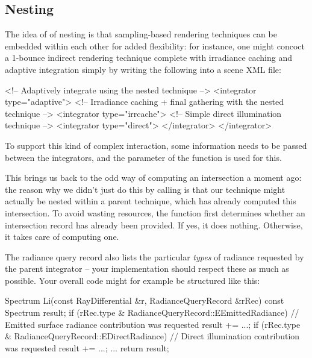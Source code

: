 \subsection{Nesting}
The idea of of nesting is that sampling-based rendering techniques can be
embedded within each other for added flexibility: for instance, one 
might concoct a  1-bounce indirect rendering technique complete with 
irradiance caching and adaptive integration simply by writing the following 
into a scene XML file:
\begin{xml}
<!-- Adaptively integrate using the nested technique -->
<integrator type="adaptive"> 
	<!-- Irradiance caching + final gathering with the nested technique -->
	<integrator type="irrcache"> 
		<!-- Simple direct illumination technique -->
		<integrator type="direct"> 
	</integrator>
</integrator>
\end{xml}
To support this kind of complex interaction, some information needs to be passed between the 
integrators, and the  parameter of the function
 is used for this.

This brings us back to the odd way of computing an intersection a moment ago: 
the reason why we didn't just do this by calling  
 is that our technique might actually be nested
within a parent technique, which has already computed this intersection.
To avoid wasting resources, the function  first 
determines whether an intersection record has already been provided. 
If yes, it does nothing. Otherwise, it takes care of computing one. 

The radiance query record also lists the particular \emph{types} of radiance requested
by the parent integrator -- your implementation should respect these as much
as possible. Your overall code might for example be structured like this:

\begin{cpp}
   Spectrum Li(const RayDifferential &r, RadianceQueryRecord &rRec) const {
	  Spectrum result;
      if (rRec.type & RadianceQueryRecord::EEmittedRadiance) {
         // Emitted surface radiance contribution was requested
		 result += ...;
	  }
      if (rRec.type & RadianceQueryRecord::EDirectRadiance) {
         // Direct illumination contribution was requested
		 result += ...;
	  }
	  ...
	  return result;
   }
\end{cpp}
